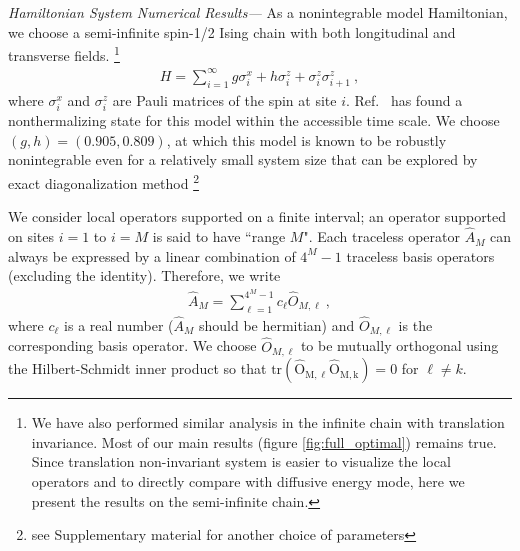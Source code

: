\documentclass[twocolumn,superscriptaddress, prb]{revtex4-1}
\begin{document}

{\it Hamiltonian System Numerical Results---}
As a nonintegrable model Hamiltonian, we choose a semi-infinite spin-1/2 Ising chain with both longitudinal and transverse fields.
\footnote{We have also performed similar analysis in the infinite chain with translation invariance. Most of our main results (figure \ref{fig:full_optimal})
remains true. Since translation non-invariant system is easier to visualize the local operators and to directly compare with diffusive energy mode, here we present the results on the semi-infinite chain.}
\begin{align}
H = \sum_{i=1}^{\infty} g\sigma^x_i + h\sigma^z_i + \sigma^z_i \sigma^z_{i+1} ~,
\label{eq:Hamiltonian}
\end{align}
where $\sigma^x_i$ and $\sigma^z_i$ are Pauli matrices of the spin at site $i$.
Ref.~ has found a nonthermalizing state for this model within the accessible time scale.
We choose $(g,h) = (0.905, 0.809)$, at which this model is known to be robustly nonintegrable even for a relatively small system size \cite{Kim:2013}
that can be explored by exact diagonalization method \footnote{see Supplementary material for another choice of parameters}

We consider local operators supported on a finite interval; an operator supported on sites $i=1$ to $i=M$ is said to have ``range $M$".
Each traceless operator
$\hat{A}_M$ can always be expressed by a linear combination of $4^M - 1$ traceless basis operators (excluding the identity).
Therefore, we write
\begin{align}
\hat{A}_M = \sum_{\ell = 1}^{4^M - 1} c_\ell \hat{O}_{M,\ell} ~,
\end{align}
where $c_\ell$ is a real number ($\hat{A}_M$ should be hermitian) and $\hat{O}_{M,\ell}$ is the corresponding basis operator.
We choose $\hat{O}_{M,\ell}$ to be mutually orthogonal using the Hilbert-Schmidt inner product so that
$\mathrm{tr(\hat{O}_{M,\ell} \hat{O}_{M,k})} = 0$ for $\ell\neq k$.
\end{document}
